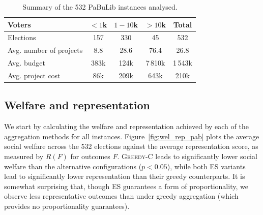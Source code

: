 \documentclass[mnsc,blindrev]{informs3_freeuse} %
\newcommand{\kibitz}[2]{\ifnum\Comments=1{\color{#1}{#2}}\fi}
\newcommand{\rf}[1]{\kibitz{blue}{[Roy says:#1]}}
\newcommand{\gb}[1]{\kibitz{red}{[GB:#1]}}
\newcommand{\pabu}{PaBuLib}
\newcommand{\costgreedy}{\textsc{Greedy-C}}
\begin{document}
\begin{table}[htb]
    \centering
    \caption{Summary of the 532 \pabu{} instances analysed. }
    \label{tab:pabulib}
    \begin{tabular}{lcccc}
    \toprule
         Voters  & $<1$k & $1-10$k & $>10$k & Total   \\ \midrule
        Elections & 157 & 330 & 45 & 532\\
        Avg. number of  projects & 8.8  & 28.6 &  76.4 & 26.8 \\
        Avg. budget    & 383k & 124k & 7\,810k & 1\,543k\\
        Avg. project cost   & 86k & 209k & 643k & 210k \\\bottomrule
    \end{tabular}
    
\end{table}

\subsection{Welfare and representation}

We start by calculating the welfare and representation achieved by each of the aggregation methods for all instances. Figure~\ref{fig:wel_rep_pab} plots the average social welfare across the 532 elections against the average representation score, as measured by $R(F)$ for outcomes $F$. 
\costgreedy{} leads to significantly lower social welfare than the alternative configurations ($p<0.05$), while both ES variants lead to significantly lower representation than their greedy counterparts. It is somewhat surprising that, though ES guarantees a form of proportionality, we observe less representative outcomes than under greedy aggregation (which provides no proportionality guarantees). %
\end{document}

